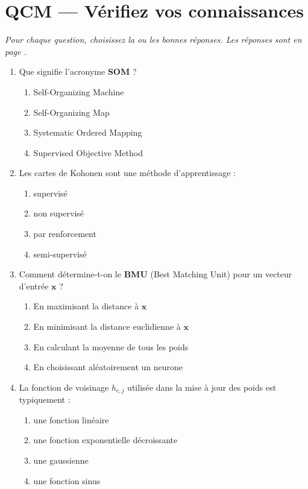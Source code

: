 \documentclass[a4paper,11pt]{article}
\theoremstyle{definition}
\begin{document}
\vspace{0.5cm}

\section*{QCM — Vérifiez vos connaissances}

\medskip
\textit{Pour chaque question, choisissez la ou les bonnes réponses. Les réponses sont en page \pageref{reponses}.}

\medskip

\begin{enumerate}

    \item Que signifie l'acronyme \textbf{SOM} ?
    \begin{enumerate}
        \item Self-Organizing Machine
        \item Self-Organizing Map
        \item Systematic Ordered Mapping
        \item Supervised Objective Method
    \end{enumerate}

    \item Les cartes de Kohonen sont une méthode d'apprentissage :
    \begin{enumerate}
        \item supervisé
        \item non supervisé
        \item par renforcement
        \item semi-supervisé
    \end{enumerate}

    \item Comment détermine-t-on le \textbf{BMU} (Best Matching Unit) pour un vecteur d'entrée $\mathbf{x}$ ?
    \begin{enumerate}
        \item En maximisant la distance à $\mathbf{x}$
        \item En minimisant la distance euclidienne à $\mathbf{x}$
        \item En calculant la moyenne de tous les poids
        \item En choisissant aléatoirement un neurone
    \end{enumerate}

    \item La fonction de voisinage $h_{c,j}$ utilisée dans la mise à jour des poids est typiquement :
    \begin{enumerate}
        \item une fonction linéaire
        \item une fonction exponentielle décroissante
        \item une gaussienne
        \item une fonction sinus
    \end{enumerate}


\end{enumerate}
\end{document}
